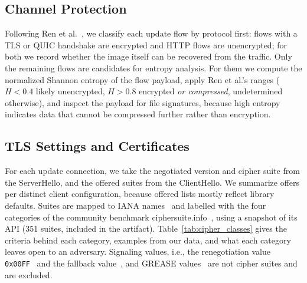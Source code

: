 \subsection{Channel Protection}

Following Ren et al.~\cite{10.1145/3355369.3355577}, we classify each update flow by protocol first: flows with a TLS or QUIC handshake are encrypted and HTTP flows are unencrypted; for both we record whether the image itself can be recovered from the traffic.
Only the remaining flows are candidates for entropy analysis.
For them we compute the normalized Shannon entropy of the flow payload, apply Ren et al.'s ranges ($H<0.4$ likely unencrypted, $H>0.8$ encrypted \emph{or compressed}, undetermined otherwise), and inspect the payload for file signatures, because high entropy indicates data that cannot be compressed further rather than encryption.

\subsection
{TLS Settings and Certificates}
\label{subsec:cipher_method}

For each update connection, we take the negotiated version and cipher suite from the ServerHello, and the offered suites from the ClientHello.
We summarize offers per distinct client configuration, because offered lists mostly reflect library defaults.
Suites are mapped to IANA names~\cite{IANA_parameters} and labelled with the four categories of the community benchmark ciphersuite.info~\cite{ciphersuite.info}, using a snapshot of its API (351 suites, included in the artifact).
Table~\ref{tab:cipher_classes} gives the criteria behind each category, examples from our data, and what each category leaves open to an adversary.
Signaling values, i.e., the renegotiation value \texttt{0x00FF}~\cite{rfc5746} and the fallback value~\cite{rfc7507}, and GREASE values~\cite{rfc8701} are not cipher suites and are excluded.

